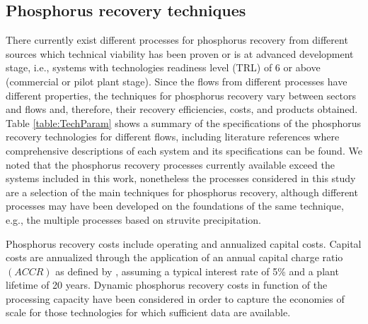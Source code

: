 \documentclass[authoryear]{elsarticle}
\begin{document}
\subsection{Phosphorus recovery techniques} \label{section:PRecoveryTechs}
There currently exist different processes for phosphorus recovery from different sources which technical viability has been proven or is at advanced development stage, i.e., systems with technologies readiness level (TRL) \citep{TRLDefinitions} of 6 or above (commercial or pilot plant stage). Since the flows from different processes have different properties, the techniques for phosphorus recovery vary between sectors and flows and, therefore, their recovery efficiencies, costs, and products obtained. Table \ref{table:TechParam} shows a summary of the specifications of the phosphorus recovery technologies for different flows, including literature references where comprehensive descriptions of each system and its specifications can be found. We noted that the phosphorus recovery processes currently available exceed the systems included in this work, nonetheless the processes considered in this study are a selection of the main techniques for phosphorus recovery,
although different processes may have been developed on the foundations of the same technique,
e.g., the multiple processes based on struvite precipitation. 

Phosphorus recovery costs include operating and annualized capital costs. Capital costs are annualized through the application of an annual capital charge ratio $\left( ACCR\right)$ as defined by \citet{towler2013chemical}, assuming a typical interest rate of 5\% and a plant lifetime of 20 years. Dynamic phosphorus recovery costs in function of the processing capacity have been considered in order to capture the economies of scale for those technologies for which sufficient data are available.
\end{document}
